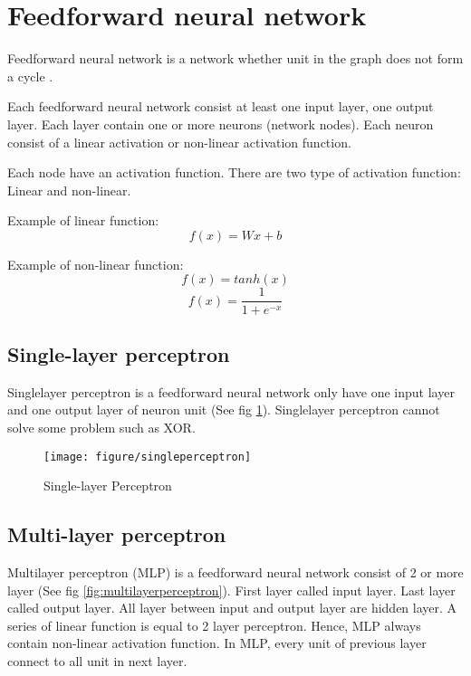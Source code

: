 \section{Feedforward neural network}
Feedforward neural network is a network whether unit in the graph does not form a cycle \cite{Goodfelloetal2016}.

Each feedforward neural network consist at least one input layer, one output layer. Each layer contain one or more neurons (network nodes). Each neuron consist of a linear activation or non-linear activation function.

Each node have an activation function. There are two type of activation function: Linear and non-linear.

Example of linear function: \\

\begin{equation} \label{eq:linearmlp}
{f(x) = Wx + b }
\end{equation}

Example of non-linear function: \\
\[f(x) = tanh(x) \]
\[f(x) =\frac{1}{1+e^{-x}} \]

\subsection{Single-layer perceptron}
Singlelayer perceptron is a feedforward neural network only have one input layer and one output layer of neuron unit (See fig \ref{fig:singleperceptron}). Singlelayer perceptron cannot solve some problem such as XOR.
\begin{figure}[H]
	\centering
	\texttt{[image: figure/singleperceptron]}
	\caption[Single-layer Perceptron]{Single-layer Perceptron}
	\label{fig:singleperceptron}
\end{figure}



\subsection{Multi-layer perceptron}
Multilayer perceptron (MLP) is a feedforward neural network consist of 2 or more layer (See fig \ref{fig:multilayerperceptron}). First layer called input layer. Last layer called output layer. All layer between input and output layer are hidden layer. A series of linear function is equal to 2 layer perceptron. Hence, MLP always contain non-linear activation function. In MLP, every unit of previous layer connect to all unit in next layer.

